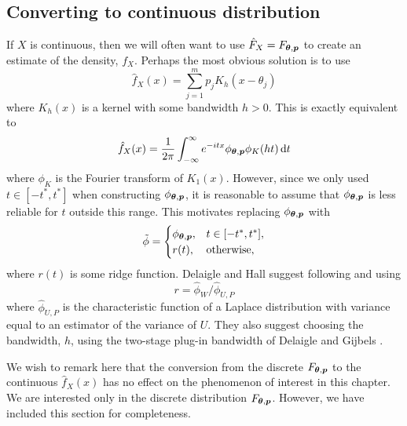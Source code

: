 	\subsection{Converting to continuous distribution}

	If $X$ is continuous, then we will often want to use $\hat{F}_X = F_{{\bm{{\theta}}}, {\bm{{p}}}}$ to create an estimate of the density, $f_X$. Perhaps the most obvious solution is to use
	\begin{equation}
		\hat{f}_X(x) = \sum_{j=1}^m p_j K_h(x - \theta_j)
	\end{equation}
	where $K_h(x)$ is a kernel with some bandwidth $h > 0$. This is exactly equivalent to 
	\begin{equation}
		\hat{f}_X(x) = \frac{1}{2\pi}\int_{-\infty}^{\infty} e^{-itx} \phi_{{\bm{{\theta}}}, {\bm{{p}}}} \phi_K(ht) \, \mathrm{d} t
	\end{equation}
	where $\phi_K$ is the Fourier transform of $K_1(x)$. However, since we only used $t \in [-t^*, t^*]$ when constructing $\phi_{{\bm{{\theta}}}, {\bm{{p}}}}$, it is reasonable to assume that $\phi_{{\bm{{\theta}}}, {\bm{{p}}}}$ is less reliable for $t$ outside this range. This motivates replacing $\phi_{{\bm{{\theta}}}, {\bm{{p}}}}$ with
	\begin{equation}
		\tilde{\phi} = 
		\begin{cases}
			\phi_{{\bm{{\theta}}}, {\bm{{p}}}}, & t \in [-t^*, t^*],\\
			r(t), & \text{otherwise},
		\end{cases}
	\end{equation}
	where $r(t)$ is some ridge function. Delaigle and Hall suggest following \cite{Delaigle2008-hl} and using
	\begin{equation}
		r = \hat{\phi}_W / \hat{\phi}_{U,P}
	\end{equation}
	where $\hat{\phi}_{U,P}$ is the characteristic function of a Laplace distribution with variance equal to an estimator of the variance of $U$. They also suggest choosing the bandwidth, $h$, using the two-stage plug-in bandwidth of Delaigle and Gijbels \cite{Delaigle2002-pa} \cite{Delaigle2004-fy}.

	We wish to remark here that the conversion from the discrete $F_{{\bm{{\theta}}}, {\bm{{p}}}}$ to the continuous $\hat{f}_X(x)$ has no effect on the phenomenon of interest in this chapter. We are interested only in the discrete distribution $F_{{\bm{{\theta}}}, {\bm{{p}}}}$. However, we have included this section for completeness.



